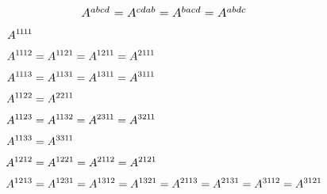 \begingroup
\small
\allowdisplaybreaks

\setlength{\jot}{.1ex} %

\begin{equation*}
\scalebox{1.1}{$ A^{abcd^{\mathstrut}} = A^{cdab} = A^{bacd} = A^{abdc} $}
\end{equation*}

\nopagebreak\vspace{-2em}
\begin{align*}
A^{1\hspace{-0.1ex}1\hspace{-0.1ex}1\hspace{-0.1ex}1} &
\\[\jot]
A^{1\hspace{-0.1ex}1\hspace{-0.1ex}12} &
= A^{1\hspace{-0.1ex}121}
= A^{121\hspace{-0.1ex}1}
= A^{21\hspace{-0.1ex}1\hspace{-0.1ex}1}
\\[\jot]
A^{1\hspace{-0.1ex}1\hspace{-0.1ex}13} &
= A^{1\hspace{-0.1ex}131}
= A^{131\hspace{-0.1ex}1}
= A^{31\hspace{-0.1ex}1\hspace{-0.1ex}1}
\\[\jot]
A^{1\hspace{-0.1ex}122} &
= A^{221\hspace{-0.1ex}1}
\\[\jot]
A^{1\hspace{-0.1ex}123} &
= A^{1\hspace{-0.1ex}132}
= A^{231\hspace{-0.1ex}1}
= A^{321\hspace{-0.1ex}1}
\\[\jot]
A^{1\hspace{-0.1ex}133} &
= A^{331\hspace{-0.1ex}1}
\\[\jot]
A^{1212} & = A^{1221} = A^{21\hspace{-0.1ex}12} = A^{2121}
\\[\jot]
A^{1213} & = A^{1231} = A^{1312} = A^{1321} = A^{21\hspace{-0.1ex}13} = A^{2131} = A^{31\hspace{-0.1ex}12} = A^{3121}

\end{align*}
